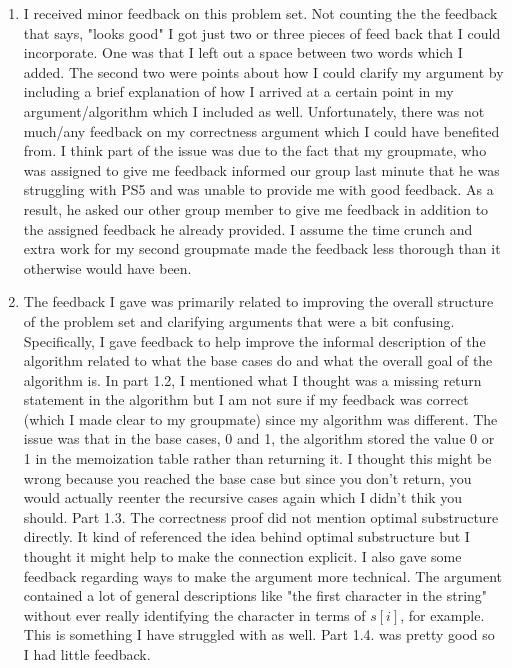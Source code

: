 \documentclass[11pt]{article}
\theoremstyle{nonumberplain}
\begin{document}
\begin{enumerate}
\item I received minor feedback on this problem set. Not counting the the feedback that says, "looks good" I got just two or three pieces of feed back that I could incorporate. One was that I left out a space between two words which I added. The second two were points about how I could clarify my argument by including a brief explanation of how I arrived at a certain point in my argument/algorithm which I included as well. Unfortunately, there was not much/any feedback on my correctness argument which I could have benefited from. I think part of the issue was due to the fact that my groupmate, who was assigned to give me feedback informed our group last minute that he was struggling with PS5 and was unable to provide me with good feedback. As a result, he asked our other group member to give me feedback in addition to the assigned feedback he already provided. I assume the time crunch and extra work for my second groupmate made the feedback less thorough than it otherwise would have been.
\item The feedback I gave was primarily related to improving the overall structure of the problem set and clarifying arguments that were a bit confusing. Specifically, I gave feedback to help improve the informal description of the algorithm related to what the base cases do and what the overall goal of the algorithm is. In part 1.2, I mentioned what I thought was a missing return statement in the algorithm but I am not sure if my feedback was correct (which I made clear to my groupmate) since my algorithm was different. The issue was that in the base cases, 0 and 1, the algorithm stored the value 0 or 1 in the memoization table rather than returning it. I thought this might be wrong because you reached the base case but since you don't return, you would actually reenter the recursive cases again which I didn't thik you should. Part 1.3. The correctness proof did not mention optimal substructure directly. It kind of referenced the idea behind optimal substructure but I thought it might help to make the connection explicit. I also gave some feedback regarding ways to make the argument more technical. The argument contained a lot of general descriptions like "the first character in the string" without ever really identifying the character in terms of $s[i]$, for example. This is something I have struggled with as well. Part 1.4. was pretty good so I had little feedback.   

\end{enumerate}
\end{document}
